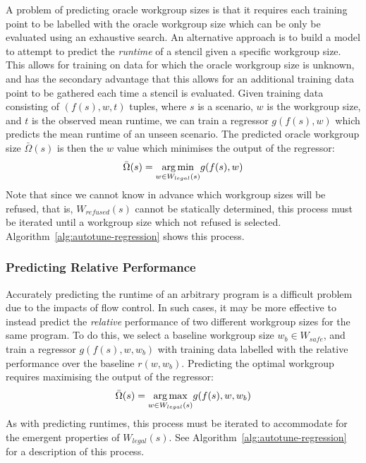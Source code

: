 \documentclass[nonatbib,preprint,10pt]{sigplanconf}
\begin{document}
A problem of predicting oracle workgroup sizes is that it requires
each training point to be labelled with the oracle workgroup size
which can be only be evaluated using an exhaustive search. An
alternative approach is to build a model to attempt to predict the
\emph{runtime} of a stencil given a specific workgroup size. This
allows for training on data for which the oracle workgroup size is
unknown, and has the secondary advantage that this allows for an
additional training data point to be gathered each time a stencil is
evaluated. Given training data consisting of $(f(s),w,t)$ tuples,
where $s$ is a scenario, $w$ is the workgroup size, and $t$ is the
observed mean runtime, we can train a regressor $g(f(s), w)$ which
predicts the mean runtime of an unseen scenario. The predicted oracle
workgroup size $\bar{\Omega}(s)$ is then the $w$ value which minimises
the output of the regressor:
%
\begin{equation}
  \bar{\Omega}(s) = \underset{w \in W_{legal}(s)}{\operatorname*{arg\,min}} g(f(s), w)
\end{equation}
%
Note that since we cannot know in advance which workgroup sizes will
be refused, that is, $W_{refused}(s)$ cannot be statically determined,
this process must be iterated until a workgroup size which not refused
is selected. Algorithm~\ref{alg:autotune-regression} shows this
process.


\subsubsection{Predicting Relative Performance}

Accurately predicting the runtime of an arbitrary program is a
difficult problem due to the impacts of flow control. In such cases,
it may be more effective to instead predict the \emph{relative}
performance of two different workgroup sizes for the same program. To
do this, we select a baseline workgroup size $w_b \in W_{safe}$, and
train a regressor $g(f(s),w,w_b)$ with training data labelled with the
relative performance over the baseline $r(w, w_b)$. Predicting the
optimal workgroup requires maximising the output of the regressor:
%
\begin{equation}
  \bar{\Omega}(s) = \underset{w \in W_{legal}(s)}{\operatorname*{arg\,max}} g(f(s),w,w_b)
\end{equation}
%
As with predicting runtimes, this process must be iterated to
accommodate for the emergent properties of $W_{legal}(s)$. See
Algorithm~\ref{alg:autotune-regression} for a description of
this process.
\end{document}
